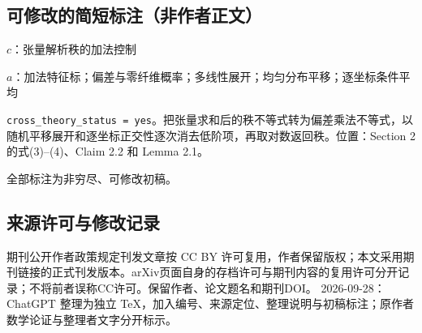 \documentclass[UTF8,11pt]{ctexart}
\theoremstyle{definition}
\begin{document}
\subsection*{可修改的简短标注（非作者正文）}
$c$：张量解析秩的加法控制

$a$：加法特征标；偏差与零纤维概率；多线性展开；均匀分布平移；逐坐标条件平均

\texttt{cross\_theory\_status = yes}。把张量求和后的秩不等式转为偏差乘法不等式，以随机平移展开和逐坐标正交性逐次消去低阶项，再取对数返回秩。位置：Section 2 的式(3)--(4)、Claim 2.2 和 Lemma 2.1。

全部标注为非穷尽、可修改初稿。
\subsection*{来源许可与修改记录}
期刊公开作者政策规定刊发文章按 CC BY 许可复用，作者保留版权；本文采用期刊链接的正式刊发版本。arXiv页面自身的存档许可与期刊内容的复用许可分开记录；不将前者误称CC许可。保留作者、论文题名和期刊DOI。
2026-09-28：ChatGPT 整理为独立 TeX，加入编号、来源定位、整理说明与初稿标注；原作者数学论证与整理者文字分开标示。
\end{document}
